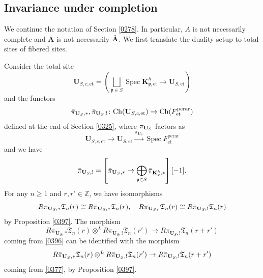 \documentclass{amsart}
\theoremstyle{remark}
\numberwithin{equation}{subsection}
\newcommand{\tensor}{\mathbin{\otimes}}
\newcommand{\Z}{\mathbb{Z}}
\newcommand{\et}{\mathrm{et}}
\newcommand{\perar}{\mathrm{perar}}
\newcommand{\alg}[1]{\mathbf{#1}}
\newcommand{\Ch}{\mathrm{Ch}}
\newcommand{\ideal}[1]{\mathfrak{#1}}
\DeclareMathOperator{\Spec}{Spec}
\begin{document}

\subsection{Invariance under completion}
\label{0464}

We continue the notation of Section \ref{0278}.
In particular, $A$ is not necessarily complete
and $\alg{A}$ is not necessarily $\Hat{\alg{A}}$.
We first translate the duality setup to total sites of fibered sites.

Consider the total site
	\[
			\alg{U}_{S, c, \et}
		=
			\left(
					\bigsqcup_{\ideal{p} \in S}
						\Spec \alg{K}_{\ideal{p}, \et}^{h}
				\to
					\alg{U}_{S, \et}
			\right)
	\]
and the functors
	\[
			\Bar{\pi}_{\alg{U}_{S}, \ast},
			\Bar{\pi}_{\alg{U}_{S}, !}
		\colon
			\Ch(\alg{U}_{S, c, \et})
		\to
			\Ch(F^{\perar}_{\et})
	\]
defined at the end of Section \ref{0325},
where $\Bar{\pi}_{\alg{U}_{S}}$ factors as
	\[
			\alg{U}_{S, c, \et}
		\to
			\alg{U}_{S, \et}
		\stackrel{\pi_{\alg{U}_{S}}}{\to}
			\Spec F^{\perar}_{\et}
	\]
and we have
	\[
			\Bar{\pi}_{\alg{U}_{S}, !}
		=
			\left[
					\Bar{\pi}_{\alg{U}_{S}, \ast}
				\to
					\bigoplus_{\ideal{p} \in S}
						\Bar{\pi}_{\alg{K}_{\ideal{p}}^{h}, \ast}
			\right][-1].
	\]
For any $n \ge 1$ and $r, r' \in \Z$, we have isomorphisms
	\[
				R \pi_{\alg{U}_{S}, \ast} \mathfrak{T}_{n}(r)
			\cong
				R \Bar{\pi}_{\alg{U}_{S}, \ast} \mathfrak{T}_{n}(r),
		\quad
				R \pi_{\alg{U}_{S}, !} \mathfrak{T}_{n}(r)
			\cong
				R \Bar{\pi}_{\alg{U}_{S}, !} \mathfrak{T}_{n}(r)
	\]
by Proposition \ref{0397}.
The morphism
	\[
				R \pi_{\alg{U}_{S}, \ast} \mathfrak{T}_{n}(r)
			\tensor^{L}
				R \pi_{\alg{U}_{S}, !} \mathfrak{T}_{n}(r')
		\to
			R \pi_{\alg{U}_{S}, !} \mathfrak{T}_{n}(r + r')
	\]
coming from \eqref{0396} can be identified with the morphism
	\[
				R \Bar{\pi}_{\alg{U}_{S}, \ast} \mathfrak{T}_{n}(r)
			\tensor^{L}
				R \Bar{\pi}_{\alg{U}_{S}, !} \mathfrak{T}_{n}(r')
		\to
			R \Bar{\pi}_{\alg{U}_{S}, !} \mathfrak{T}_{n}(r + r')
	\]
coming from \eqref{0377},
by Proposition \ref{0397}.
\end{document}
